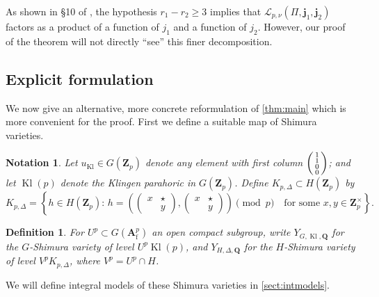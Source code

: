 \documentclass[cjm]{ipart}
\newenvironment{smatrix}{\left( \begin{smallmatrix} } {\end{smallmatrix} \right) }
\theoremstyle{plain}
\newtheorem{definition}[theorem]{Definition}
\newtheorem{notation}[theorem]{Notation}
\theoremstyle{remark}
\DeclareMathOperator{\Kl}{Kl}
\newcommand{\Af}{\AA_{\mathrm{f}}}
\newcommand{\QQ}{\mathbf{Q}}
\newcommand{\Zp}{\mathbf{Z}_p}
\newcommand{\bfj}{\mathbf{j}}
\newcommand{\cL}{\mathcal{L}}
\renewcommand{\AA}{\mathbf{A}}
\numberwithin{equation}{subsection}
\renewcommand{\ge}{\geqslant}
\begin{document}
  \begin{note} As shown in \S 10 of \cite{LPSZ1}, the hypothesis $r_1 - r_2 \ge 3$ implies that $\cL_{p, \nu}(\Pi, \bfj_1, \bfj_2)$ factors as a product of a function of $j_1$ and a function of $j_2$. However, our proof of the theorem will not directly ``see'' this finer decomposition.
  \end{note}

 \subsection{Explicit formulation}
  \label{ssec:testdataatp}

  We now give an alternative, more concrete reformulation of \cref{thm:main} which is more convenient for the proof. First we define a suitable map of Shimura varieties.

  \begin{notation}
   Let $u_{\Kl} \in G(\Zp)$ denote any element with first column $\begin{smatrix} 1 \\ 1 \\ 0 \\ 0 \end{smatrix}$; and let $\Kl(p)$ denote the Klingen parahoric in $G(\Zp)$. Define $K_{p, \Delta} \subset H(\Zp)$ by
   \[
     K_{p,\Delta}=\left\{ h\in H(\Zp):\, h=\left(\begin{pmatrix} x & \star\\  & y\end{pmatrix},\begin{pmatrix} x & \star\\  & y\end{pmatrix}\right)\pmod{p}\quad\text{for some $x, y \in \Zp^\times$}\right\}.
   \]
  \end{notation}

  \begin{definition}
   For $U^p \subset G(\Af^p)$ an open compact subgroup, write $Y_{G, \Kl,\QQ}$ for the $G$-Shimura variety of level $U^p \Kl(p)$, and $Y_{H, \Delta,\QQ}$ for the $H$-Shimura variety of level $V^p K_{p, \Delta}$, where $V^p = U^p \cap H$.

  \end{definition}

  \begin{remark}
   We will define integral models of these Shimura varieties in \cref{sect:intmodels}.
  \end{remark}
\end{document}
